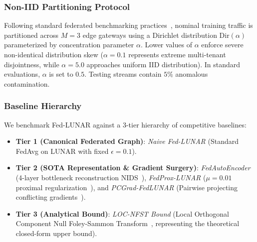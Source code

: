 \subsubsection{Non-IID Partitioning Protocol}
Following standard federated benchmarking practices~\cite{hsu2019measuring,wang2022fedod}, nominal training traffic is partitioned across $M = 3$ edge gateways using a Dirichlet distribution $\text{Dir}(\alpha)$ parameterized by concentration parameter $\alpha$. Lower values of $\alpha$ enforce severe non-identical distribution skew ($\alpha = 0.1$ represents extreme multi-tenant disjointness, while $\alpha = 5.0$ approaches uniform IID distribution). In standard evaluations, $\alpha$ is set to $0.5$. Testing streams contain $5\%$ anomalous contamination.

\subsubsection{Baseline Hierarchy}
We benchmark Fed-LUNAR against a 3-tier hierarchy of competitive baselines:
\begin{itemize}
    \item \textbf{Tier 1 (Canonical Federated Graph)}: \emph{Naive Fed-LUNAR} (Standard FedAvg on LUNAR with fixed $\epsilon = 0.1$).
    \item \textbf{Tier 2 (SOTA Representation \& Gradient Surgery)}: \emph{FedAutoEncoder} (4-layer bottleneck reconstruction NIDS~\cite{sakurada2014anomaly}), \emph{FedProx-LUNAR} ($\mu = 0.01$ proximal regularization~\cite{li2020federated}), and \emph{PCGrad-FedLUNAR} (Pairwise projecting conflicting gradients~\cite{yu2020gradient}).
    \item \textbf{Tier 3 (Analytical Bound)}: \emph{LOC-NFST Bound} (Local Orthogonal Component Null Foley-Sammon Transform~\cite{foley1975optimal}, representing the theoretical closed-form upper bound).
\end{itemize}

